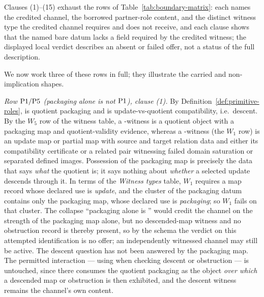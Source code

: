 Clauses (1)--(15) exhaust the rows of Table~\ref{tab:boundary-matrix}: each
names the credited channel, the borrowed partner-role content, and the
distinct witness type the credited channel requires and does not receive, and
each clause shows that the named bare datum lacks a field required by the
credited witness; the displayed local verdict describes an absent or failed
offer, not a status of the full description.

We now work three of these rows in full; they illustrate the carried and
non-implication shapes.

\emph{Row \(\mathrm{P1}{}/\mathrm{P5}{}\) (packaging alone is not \(\mathrm{P1}{}\)), clause
(1).} By Definition~\ref{def:primitive-roles}, \Pfive{} is quotient packaging
and \Pone{} is update-vs-quotient compatibility, i.e.\ descent. By the
\(W_5\) row of the witness table, a \Pfive{}-witness is a quotient object
with a packaging map and quotient-validity evidence, whereas a
\Pone{}-witness (the \(W_1\) row) is an update map or partial map with source
and target relation data and either its compatibility certificate or a related
pair witnessing failed domain saturation or separated defined images. Possession of the packaging
map is precisely the data that says \emph{what} the quotient is; it says nothing
about \emph{whether} a selected update descends through it. In terms of the
\emph{Witness types} table, \(W_1\) requires a map record whose declared use is
\emph{update}, and the \Pfive{} cluster of the packaging datum contains only
the packaging map, whose declared use is \emph{packaging}; so \(W_1\) fails on
that cluster. The collapse
``packaging alone is \Pone{}'' would credit the \Pone{} channel on the strength
of the packaging map alone, but no descended-map witness and no obstruction
record is thereby present, so by the schema the verdict on this attempted
identification is no offer; an independently witnessed \Pone{} channel may
still be active. The descent question has not been answered by the packaging
map. The
permitted interaction --- \Pone{} using \Pfive{} when checking descent or
obstruction --- is untouched, since there \Pone{} consumes the quotient
packaging as the object \emph{over which} a descended map or obstruction is then
exhibited, and the descent witness remains the \Pone{} channel's own content.

